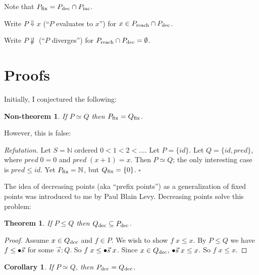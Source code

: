 \documentclass{article}
\newcommand{\N}{\mathbb{N}}
\newcommand{\todo}[1]{{\color{red}{#1}}}
\newtheorem{theorem}{Theorem}
\newtheorem{corollary}{Corollary}
\newtheorem{nontheorem}{Non-theorem}
\newenvironment{refutation}
  {\vspace{0.5em}\noindent\textit{Refutation.}}
  {\hfill$\square$\vspace{0.5em}}
\begin{document}
\todo{Do we need to consider increasing points?}

Note that ${P}_{\text{fix}} = {P}_{\text{dec}} \cap {P}_{\text{inc}}$.

\newcommand{\eval}{\Downarrow}
\newcommand{\diverge}{\not\eval}

Write $P \eval x$ (``$P$ evaluates to $x$'') for $x \in {P}_{\text{reach}} \cap {P}_{\text{dec}}$.

Write $P \diverge$ (``$P$ diverges'') for ${P}_{\text{reach}} \cap {P}_{\text{dec}} = \emptyset$.


\section{Proofs}

Initially, I conjectured the following:

\begin{nontheorem}
  If $P \simeq Q$ then ${P}_{\text{fix}} = {Q}_{\text{fix}}$.
\end{nontheorem}

However, this is false:

\begin{refutation}
  Let $S = \N$ ordered $0 < 1 < 2 < ...$. Let $P = \{id\}$. Let $Q = \{id,
  pred\}$, where $pred\; 0 = 0$ and $pred\; (x+1) = x$. Then $P \simeq Q$; the
  only interesting case is $pred \le id$. Yet $\fixed{P} = \N$, but ${Q}_{\text{fix}} =
  \{0\}$.
\end{refutation}

The idea of decreasing points (aka ``prefix points'') as a generalization of
fixed points was introduced to me by Paul Blain Levy. Decreasing points solve
this problem:

\begin{theorem}
  If $P \le Q$ then ${Q}_{\text{dec}} \subseteq {P}_{\text{dec}}$.
  \label{thm:dec-antitone}
\end{theorem}

\begin{proof}
  Assume $x \in {Q}_{\text{dec}}$ and $f \in P$. We wish to show $f\;x \le x$. By $P
  \le Q$ we have $f \le {\bullet\vec{s}}$ for some $\vec{s} : Q$. So $f\;x \le
  {\bullet\vec{s}}\;x$. Since $x \in {Q}_{\text{dec}}$, ${\bullet\vec{s}}\;x \le x$. So $f\; x \le x$.
\end{proof}

\todo{Maybe the ordering on programs is the opposite of what it should be?}

\begin{corollary}
  If $P \simeq Q$, then ${P}_{\text{dec}} = {Q}_{\text{dec}}$.
  \label{cor:simeq->dec}
\end{corollary}
\end{document}
